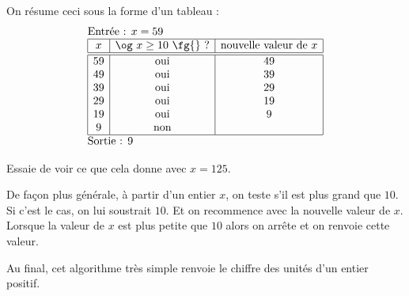 \documentclass[class=report,crop=false, 12pt]{standalone}
\begin{document}
On résume ceci sous la forme d'un tableau :
  $$
  \begin{array}{l}
  \text{Entrée : $x=59$}    \\
  \begin{array}{|c|c|c|}
  \hline  
   x & \text{\og $x\ge10$ \fg{} ?} & \text{nouvelle valeur de } x \\
  \hline\hline 
  59 & \text{oui} & 49 \\
  49 & \text{oui} & 39 \\
  39 & \text{oui} & 29 \\
  29 & \text{oui} & 19 \\
  19 & \text{oui} & 9 \\
  9 & \text{non} &  \\ 
  \hline
  \end{array} \\
  \text{Sortie : $9$}  
  \end{array} 
  $$ 


Essaie de voir ce que cela donne avec $x=125$.

De façon plus générale, à partir d'un entier $x$, on teste s'il est plus grand que $10$. Si c'est le cas, on lui soustrait $10$. Et on recommence avec la nouvelle valeur de $x$. Lorsque la valeur de $x$ est plus petite que $10$ alors on arrête et on renvoie cette valeur. 

Au final, cet algorithme très simple renvoie le chiffre des unités d'un entier positif.

\bigskip
\bigskip
\end{document}
